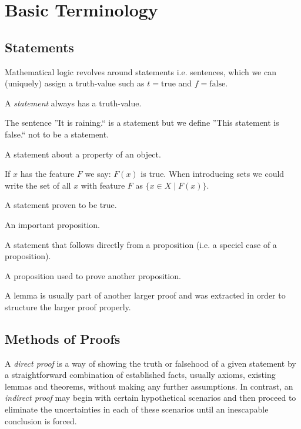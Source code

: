 \section{Basic Terminology}
\subsection{Statements}
Mathematical logic revolves around statements i.e. sentences, which we can (uniquely) assign a truth-value such as \(t = \text{true}\) and \(f = \text{false}\).
\begin{definition}[Statement]
   A \textit{statement} always has a truth-value.
\end{definition}
\begin{example}
   The sentence ''It is raining.`` is a statement but we define ''This statement is false.`` not to be a statement.
\end{example}

\begin{definition}[Predicate]
   A statement about a property of an object.
\end{definition}
\begin{remark}
   If \(x\) has the feature \(F\) we say: \(F(x)\) is true.
   When introducing sets we could write the set of all \(x\) with feature \(F\) as \(\{x \in X \mid F(x)\}\).
\end{remark}

\begin{definition}[Proposition]
   A statement proven to be true.
\end{definition}

\begin{definition}[Theorem]
   An important proposition.
\end{definition}

\begin{definition}[Corollary]
   A statement that follows directly from a proposition (i.e. a speciel case of a proposition).
\end{definition}

\begin{definition}[Lemma]
   A proposition used to prove another proposition.
\end{definition}
\begin{remark}
   A lemma is usually part of another larger proof and was extracted in order to structure the larger proof properly.
\end{remark}

\subsection{Methods of Proofs}
A \textit{direct proof} is a way of showing the truth or falsehood of a given statement by a straightforward combination of established facts, usually axioms, existing lemmas and theorems, without making any further assumptions.
In contrast, an \textit{indirect proof} may begin with certain hypothetical scenarios and then proceed to eliminate the uncertainties in each of these scenarios until an inescapable conclusion is forced.

